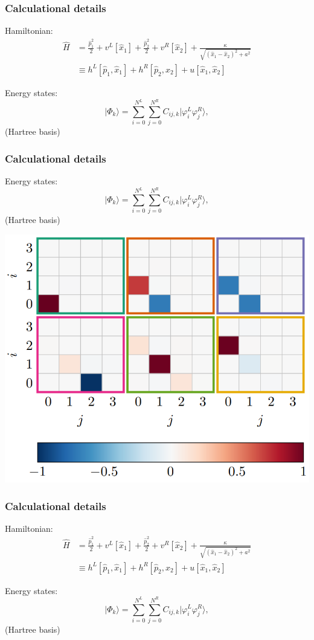 \documentclass{beamer}
\begin{document}
\begin{frame}
\frametitle{Calculational details}

Hamiltonian:
\begin{align}
\hat{H} &= \frac{\hat{p}_1^2}{2} + v^L[\hat{x}_1] + \frac{\hat{p}_2^2}{2} + v^R[\hat{x}_2] + \frac{\kappa}{\sqrt{(\hat{x}_1-\hat{x}_2)^2 + a^2}} \\
&\equiv h^L[\hat{p}_1,\hat{x}_1] + h^R[\hat{p}_2,\hat{x}_2] + u[\hat{x}_1,\hat{x}_2]
\end{align}

Energy states:
\begin{equation}
\vert\Phi_k\rangle = \sum_{i = 0}^{N^L} \sum_{j = 0}^{N^R} C_{ij, k}\vert \varphi^L_i \varphi^R_j\rangle,
\end{equation}
(Hartree basis)
\end{frame}

\begin{frame}
\frametitle{Calculational details}

Energy states:
\begin{equation}
\vert\Phi_k\rangle = \sum_{i = 0}^{N^L} \sum_{j = 0}^{N^R} C_{ij, k}\vert \varphi^L_i \varphi^R_j\rangle,
\end{equation}
(Hartree basis)

\vspace{6mm}

\centerline{\includegraphics[width=0.7\linewidth]{qcfigures/Hartree_coefs.png}}

\vspace{6mm}
\end{frame}

\begin{frame}
\frametitle{Calculational details}

Hamiltonian:
\begin{align}
\hat{H} &= \frac{\hat{p}_1^2}{2} + v^L[\hat{x}_1] + \frac{\hat{p}_2^2}{2} + v^R[\hat{x}_2] + \frac{\kappa}{\sqrt{(\hat{x}_1-\hat{x}_2)^2 + a^2}} \\
&\equiv h^L[\hat{p}_1,\hat{x}_1] + h^R[\hat{p}_2,\hat{x}_2] + u[\hat{x}_1,\hat{x}_2]
\end{align}

Energy states:
\begin{equation}
\vert\Phi_k\rangle = \sum_{i = 0}^{N^L} \sum_{j = 0}^{N^R} C_{ij, k}\vert \varphi^L_i \varphi^R_j\rangle,
\end{equation}
(Hartree basis)
\end{frame}
\end{document}

